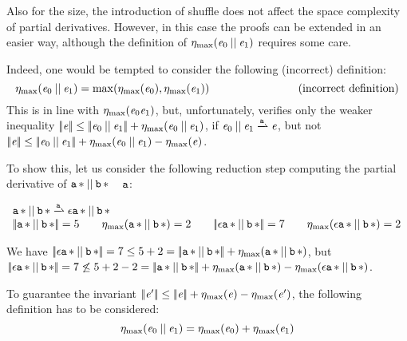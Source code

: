 Also for the size, the introduction of shuffle does not affect the space complexity of partial derivatives. However, in this case the proofs can be extended in an easier way, although the definition of ${\eta_{\max}}({\mathit {e}_0\mathbin{||}\mathit {e}_1})$ requires some care.

Indeed, one would be tempted to consider the following (incorrect) definition:
\[
 {\eta_{\max}}({\mathit {e}_0\mathbin{||}\mathit {e}_1})=\max({\eta_{\max}}({\mathit {e}_0}),{\eta_{\max}}({\mathit {e}_1}))
 \qquad\qquad\qquad\qquad\mbox{(incorrect definition)}
\]
This is in line with ${\eta_{\max}}({\mathit {e}_0\mathit {e}_1})$,
but, unfortunately, verifies only the weaker inequality
${{\mid\!\mid}}{\mathit {e}}{{\mid\!\mid}}\leq{{\mid\!\mid}}{\ensuremath{\mathit {e}}_0\mathbin{||}\ensuremath{\mathit {e}}_1}{{\mid\!\mid}}+{\eta_{\max}}({\mathit {e}_0\mathbin{||}\mathit {e}_1})$, if $\re_0\shuffleop\re_1\parDer{\sym}\re$, but not ${{\mid\!\mid}}{\mathit {e}}{{\mid\!\mid}}\leq{{\mid\!\mid}}{\ensuremath{\mathit {e}}_0\mathbin{||}\ensuremath{\mathit {e}}_1}{{\mid\!\mid}}+{\eta_{\max}}({\mathit {e}_0\mathbin{||}\mathit {e}_1})-{\eta_{\max}}({\mathit {e}})$.

To show this, let us consider the following reduction step computing the partial derivative of ${{\mathtt {a}}\mathop{*}}\mathbin{||}{{\mathtt {b}}\mathop{*}}$ \wrt~ $\mathtt {a}$:
\begin{flushleft}
 $
  \begin{array}{l}
   \starop{\sym}\shuffleop\starop{\asym}\parDer{\sym}\eps\catop\starop{\sym}\shuffleop\starop{\asym} \\
   \tsize{\starop{\sym}\shuffleop\starop{\asym}}=5 \qquad
   \incFunSize{\starop{\sym}\shuffleop\starop{\asym}}=2 \qquad
   \tsize{\eps\catop\starop{\sym}\shuffleop\starop{\asym}}=7 \qquad
   \incFunSize{\eps\catop\starop{\sym}\shuffleop\starop{\asym}}=2
  \end{array}
 $
\end{flushleft}
We have ${{\mid\!\mid}}{\mathtt {\epsilon}{{\mathtt {a}}\mathop{*}}\mathbin{||}{{\mathtt {b}}\mathop{*}}}{{\mid\!\mid}}=7\leq 5+2={{\mid\!\mid}}{{{\mathtt {a}}\mathop{*}}\mathbin{||}{{\mathtt {b}}\mathop{*}}}{{\mid\!\mid}}+{\eta_{\max}}({{{\mathtt {a}}\mathop{*}}\mathbin{||}{{\mathtt {b}}\mathop{*}}})$, but
${{\mid\!\mid}}{\mathtt {\epsilon}{{\mathtt {a}}\mathop{*}}\mathbin{||}{{\mathtt {b}}\mathop{*}}}{{\mid\!\mid}}=7\not\leq 5+2-2={{\mid\!\mid}}{{{\mathtt {a}}\mathop{*}}\mathbin{||}{{\mathtt {b}}\mathop{*}}}{{\mid\!\mid}}+{\eta_{\max}}({{{\mathtt {a}}\mathop{*}}\mathbin{||}{{\mathtt {b}}\mathop{*}}})-{\eta_{\max}}({\mathtt {\epsilon}{{\mathtt {a}}\mathop{*}}\mathbin{||}{{\mathtt {b}}\mathop{*}}})$.

To guarantee the invariant ${{\mid\!\mid}}{\mathit {e}'}{{\mid\!\mid}}\leq{{\mid\!\mid}}{\ensuremath{\mathit {e}}}{{\mid\!\mid}}+{\eta_{\max}}({\mathit {e}})-{\eta_{\max}}({\mathit {e}'})$, the following definition has to be considered:
\[
 {\eta_{\max}}({\mathit {e}_0\mathbin{||}\mathit {e}_1})={\eta_{\max}}({\mathit {e}_0})+{\eta_{\max}}({\mathit {e}_1})
\]

